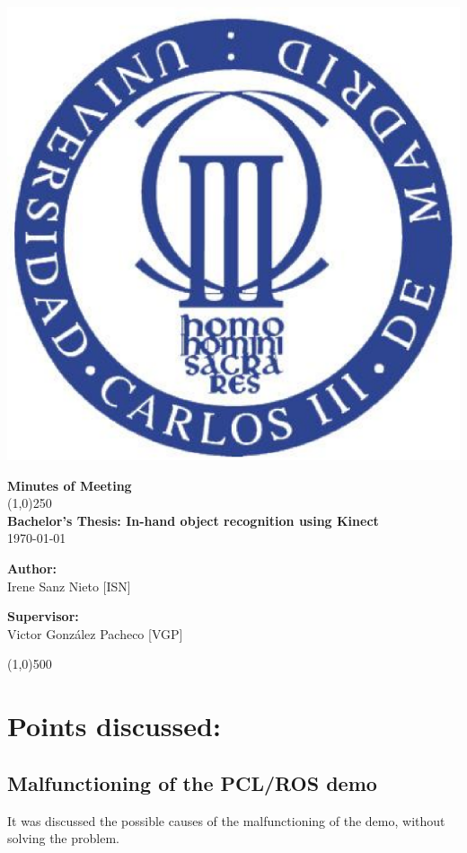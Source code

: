 \documentclass{article}
\newenvironment{myindentpar}[1]%
 {\begin{list}{}%
         {\setlength{\leftmargin}{#1}}%
         \item[]%
 }
 {\end{list}}
\begin{document}
\includegraphics[width=0.1\linewidth]{../template/uc3m.eps}

\vspace{-1cm}
\begin{minipage}[b]{1\linewidth}
	\begin{center}
	{\Huge \bfseries{Minutes of Meeting}}\\
	\line(1,0){250}\\[1cm]
	{\LARGE \textbf{Bachelor's Thesis: In-hand object recognition using Kinect}}\\[0.5cm]
	{\large \today}
	\end{center}
\end {minipage}



\begin{minipage}{0.55\textwidth}
\begin{flushleft} \large
\textbf{{Author:}\\}
Irene Sanz Nieto [ISN]\\
\end{flushleft}
\end{minipage}
\begin{minipage}{0.4\textwidth}
\begin{flushright} \large
\textbf{Supervisor: }\\
Victor González Pacheco [VGP]
\end{flushright}\end{minipage}

\begin{center}
\line(1,0){500}
\end{center}

\renewcommand{\thesubsection}
{\hspace*{1cm} \arabic{section}.\arabic{subsection}}



\section{\LARGE Points discussed: }
	\subsection{Malfunctioning of the PCL/ROS demo}
		\begin{myindentpar}{1cm} 
		It was discussed the possible causes of the malfunctioning of the demo, without solving the problem. 
		\end{myindentpar}
\end{document}
